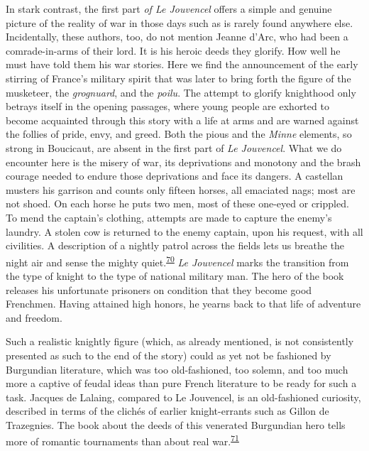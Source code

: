 In stark contrast, the first part \emph{of Le Jouvencel} offers a simple
and genuine picture of the reality of war in those days such as is
rarely found anywhere else. Incidentally, these authors, too, do not
mention Jeanne d'Arc, who had been a comrade-in-arms of their lord. It
is his heroic deeds they glorify. How well he must have told them his
war stories. Here we find the announcement of the early stirring of
France's military spirit that was later to bring forth the figure of the
musketeer, the \emph{grognuard}, and the \emph{poilu}. The attempt to
glorify knighthood only betrays itself in the opening passages, where
young people are exhorted to become acquainted through this story with a
life at arms and are warned against the follies of pride, envy, and
greed. Both the pious and the \emph{Minne} elements, so strong in
Boucicaut, are absent in the first part of \emph{Le Jouvencel}. What we
do encounter here is the misery of war, its deprivations and monotony
and the brash courage needed to endure those deprivations and face its
dangers. A castellan musters his garrison and counts only fifteen
horses, all emaciated nags; most are not shoed. On each horse he puts
two men, most of these one-eyed or crippled. To mend the captain's
clothing, attempts are made to capture the enemy's laundry. A stolen cow
is returned to the enemy captain, upon his request, with all civilities.
A description of a nightly patrol across the fields lets us breathe the
night air and sense the mighty
quiet.\textsuperscript{\protect\hypertarget{10_Chapter_Three__THE_HEROIC_DREAM.xhtmlux5cux23id_1794}{\protect\hyperlink{23_NOTES.xhtmlux5cux23id_1795}{70}}}
\emph{Le Jouvencel} marks the transition from the type of knight to the
type of national military man. The hero of the book releases his
unfortunate prisoners on condition that they become good Frenchmen.
Having attained high honors, he yearns back to that life of adventure
and freedom.

Such a realistic knightly figure (which, as already mentioned, is
\protect\hypertarget{10_Chapter_Three__THE_HEROIC_DREAM.xhtmlux5cux23page_81}{}{}not
consistently presented as such to the end of the story) could as yet not
be fashioned by Burgundian literature, which was too old-fashioned, too
solemn, and too much more a captive of feudal ideas than pure French
literature to be ready for such a task. Jacques de Lalaing, compared to
Le Jouvencel, is an old-fashioned curiosity, described in terms of the
clichés of earlier knight-errants such as Gillon de Trazegnies. The book
about the deeds of this venerated Burgundian hero tells more of romantic
tournaments than about real
war.\textsuperscript{\protect\hypertarget{10_Chapter_Three__THE_HEROIC_DREAM.xhtmlux5cux23id_1792}{\protect\hyperlink{23_NOTES.xhtmlux5cux23id_1793}{71}}}

